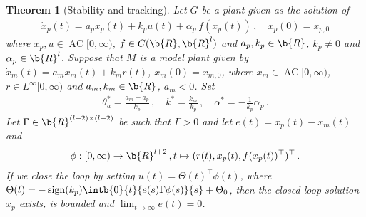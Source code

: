 \documentclass[12pt,a4paper]{article}
\newtheorem{theorem}{Theorem}
\DeclareMathOperator{\sign}{sign}
\DeclareMathOperator{\AC}{AC}
\begin{document}
	\begin{theorem}[Stability and tracking]
		Let $G$ be a plant given as the solution of
		\begin{align*}
			\dot{x}_p(t) = a_p x_p(t) + k_p u(t) + \alpha_p^\top f(x_p(t))\,, \quad 
			x_p(0) = x_{p,0}
		\end{align*}
		where 
		$x_p, u \in \AC[0,\infty)$, $f\in C(\b{R},\b{R}^l)$ and $a_p,k_p \in \b{R}$, $k_p \neq 0$ and $\alpha_p \in \b{R}^l$. 
		Suppose that $M$ is a model plant given by $\dot{x}_m(t) = a_m x_m(t) + k_m r(t)$, $x_m(0) = x_{m,0}$, where $x_m\in \AC[0,\infty)$, $r \in L^\infty[0,\infty)$ and $a_m,k_m \in \b{R}$, $a_m < 0$. 
		Set 
		\begin{align*}
			\theta_a^* = \frac{a_m-a_p}{k_p}\,, \quad 
			k^* = \frac{k_m}{k_p}\,, \quad 
			\alpha^* = -\frac{1}{k_p}\alpha_p\,.
		\end{align*}
		Let $\Gamma \in \b{R}^{(l+2) \times (l+2)}$ be such that $\Gamma > 0$ and let $e(t) = x_p(t) - x_m(t)$ and 
		\begin{align*}
			\phi:[0,\infty) \to \b{R}^{l+2}\,, t \mapsto (r(t), x_p(t), f(x_p(t))^\top)^\top\,.
		\end{align*}
		If we close the loop by setting $u(t) = \Theta(t)^\top \phi(t)$, where $\Theta(t) = -\sign(k_p)\intb{0}{t}{e(s)\Gamma\phi(s)}{s} + \Theta_0$, then the closed loop solution $x_p$ exists, is bounded and $\lim_{t \to \infty} e(t) = 0$.
	\end{theorem}
\end{document}
